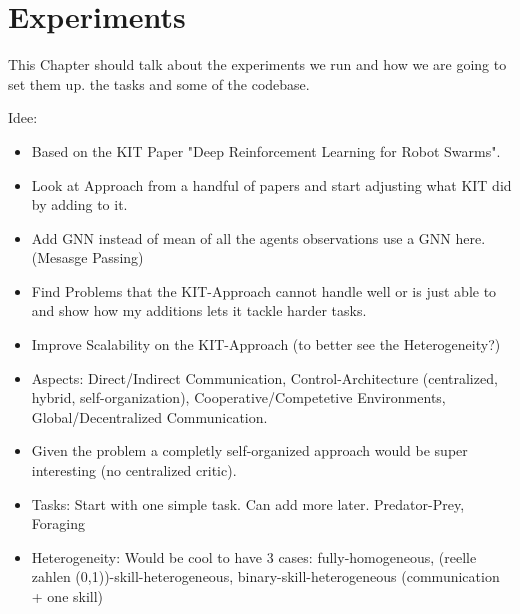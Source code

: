 
\chapter{Experiments}
\label{ch:Experiments}

This Chapter should talk about the experiments we run and how we are going to set them up. the tasks and some of the codebase.

Idee:
\begin{itemize}[noitemsep,nolistsep]
    \item Based on the KIT Paper "Deep Reinforcement Learning for Robot Swarms".
    \item Look at Approach from a handful of papers and start adjusting what KIT did by adding to it.
    \item Add GNN instead of mean of all the agents observations use a GNN here. (Mesasge Passing)
    \item Find Problems that the KIT-Approach cannot handle well or is just able to and show how my additions lets it tackle harder tasks.
    \item Improve Scalability on the KIT-Approach (to better see the Heterogeneity?)
    \item Aspects: Direct/Indirect Communication, Control-Architecture (centralized, hybrid, self-organization), Cooperative/Competetive Environments, Global/Decentralized Communication.
    \item Given the problem a completly self-organized approach would be super interesting (no centralized critic).
    \item Tasks: Start with one simple task. Can add more later. Predator-Prey, Foraging
    \item Heterogeneity: Would be cool to have 3 cases: fully-homogeneous, (reelle zahlen (0,1))-skill-heterogeneous, binary-skill-heterogeneous (communication + one skill)
\end{itemize} 